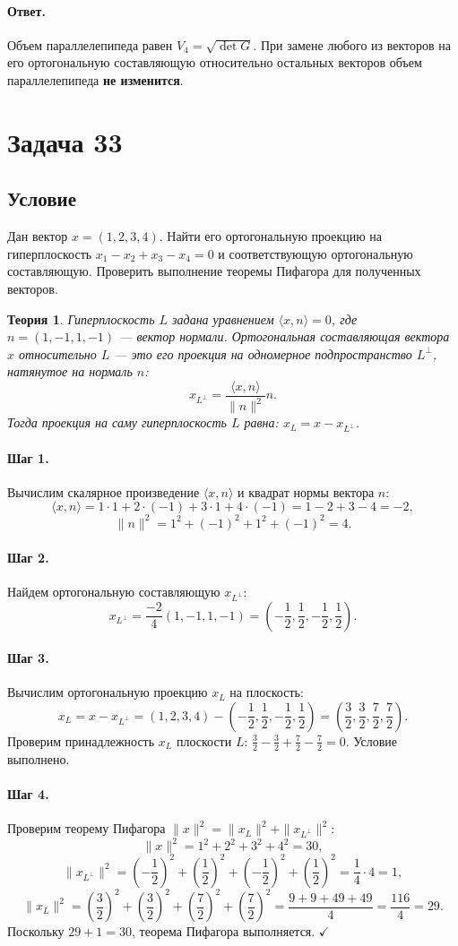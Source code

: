 \documentclass[12pt,a4paper]{article}
\theoremstyle{solution}
\newtheorem*{theory}{Теория}
\newcommand{\task}[1]{\newpage\section*{Задача #1}}
\newcommand{\answer}{\paragraph{Ответ.}}
\newcommand{\step}[1]{\paragraph{Шаг #1.}}
\begin{document}
\answer
Объем параллелепипеда равен $V_4 = \sqrt{\det G}$. При замене любого из векторов на его ортогональную составляющую относительно остальных векторов объем параллелепипеда \textbf{не изменится}.

\task{33}
\subsection*{Условие}
Дан вектор $x = (1, 2, 3, 4)$. Найти его ортогональную проекцию на гиперплоскость $x_1 - x_2 + x_3 - x_4 = 0$ и соответствующую ортогональную составляющую. Проверить выполнение теоремы Пифагора для полученных векторов.

\begin{theory}
Гиперплоскость $L$ задана уравнением $\langle x, n\rangle = 0$, где $n = (1, -1, 1, -1)$ — вектор нормали. Ортогональная составляющая вектора $x$ относительно $L$ — это его проекция на одномерное подпространство $L^\perp$, натянутое на нормаль $n$:
\[
x_{L^\perp} = \frac{\langle x, n\rangle}{\|n\|^2} n.
\]
Тогда проекция на саму гиперплоскость $L$ равна: $x_L = x - x_{L^\perp}$.
\end{theory}

\step{1} Вычислим скалярное произведение $\langle x, n\rangle$ и квадрат нормы вектора $n$:
\[
\langle x, n\rangle = 1\cdot 1 + 2\cdot(-1) + 3\cdot 1 + 4\cdot(-1) = 1 - 2 + 3 - 4 = -2,
\]
\[
\|n\|^2 = 1^2 + (-1)^2 + 1^2 + (-1)^2 = 4.
\]

\step{2} Найдем ортогональную составляющую $x_{L^\perp}$:
\[
x_{L^\perp} = \frac{-2}{4} (1, -1, 1, -1) = \left(-\frac{1}{2}, \frac{1}{2}, -\frac{1}{2}, \frac{1}{2}\right).
\]

\step{3} Вычислим ортогональную проекцию $x_L$ на плоскость:
\[
x_L = x - x_{L^\perp} = (1, 2, 3, 4) - \left(-\frac{1}{2}, \frac{1}{2}, -\frac{1}{2}, \frac{1}{2}\right) = \left(\frac{3}{2}, \frac{3}{2}, \frac{7}{2}, \frac{7}{2}\right).
\]
Проверим принадлежность $x_L$ плоскости $L$: $\frac{3}{2} - \frac{3}{2} + \frac{7}{2} - \frac{7}{2} = 0$. Условие выполнено.

\step{4} Проверим теорему Пифагора $\|x\|^2 = \|x_L\|^2 + \|x_{L^\perp}\|^2$:
\[
\|x\|^2 = 1^2 + 2^2 + 3^2 + 4^2 = 30,
\]
\[
\|x_{L^\perp}\|^2 = \left(-\frac{1}{2}\right)^2 + \left(\frac{1}{2}\right)^2 + \left(-\frac{1}{2}\right)^2 + \left(\frac{1}{2}\right)^2 = \frac{1}{4} \cdot 4 = 1,
\]
\[
\|x_L\|^2 = \left(\frac{3}{2}\right)^2 + \left(\frac{3}{2}\right)^2 + \left(\frac{7}{2}\right)^2 + \left(\frac{7}{2}\right)^2 = \frac{9 + 9 + 49 + 49}{4} = \frac{116}{4} = 29.
\]
Поскольку $29 + 1 = 30$, теорема Пифагора выполняется. \quad$\checkmark$
\end{document}
